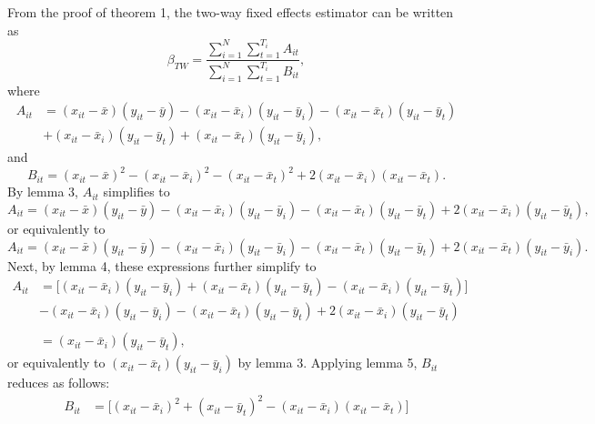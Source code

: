 \documentclass{article}[12pt]
\newenvironment{proof}[1][Proof.]{\begin{trivlist}
\item[\hskip \labelsep {\bfseries #1}]}{\end{trivlist}}
\begin{document}
\begin{proof}
From the proof of theorem 1, the two-way fixed effects estimator can be written as
\begin{equation}
\beta_{TW}=\frac{\sum_{i=1}^N\sum_{t=1}^{T_i} A_{it}}{\sum_{i=1}^N\sum_{t=1}^{T_i} B_{it}},
\end{equation}
where
\begin{align}
A_{it} & = (x_{it}  - \bar{x})(y_{it}  - \bar{y}) - (x_{it}  - \bar{x}_i)(y_{it}  - \bar{y}_i) - (x_{it}  - \bar{x}_t)(y_{it}  - \bar{y}_t) \nonumber\\
& + (x_{it}  - \bar{x}_i)(y_{it}  - \bar{y}_t) + (x_{it}  - \bar{x}_t)(y_{it}  - \bar{y}_i),
\end{align}
and
\begin{equation}
B_{it} =  (x_{it}  - \bar{x})^2 - (x_{it}  - \bar{x}_i)^2 - (x_{it}  - \bar{x}_t)^2 + 2(x_{it}  - \bar{x}_i)(x_{it}  - \bar{x}_t).
\end{equation}
By lemma 3, $A_{it}$ simplifies to
\begin{equation}
A_{it} = (x_{it}  - \bar{x})(y_{it}  - \bar{y}) - (x_{it}  - \bar{x}_i)(y_{it}  - \bar{y}_i) - (x_{it}  - \bar{x}_t)(y_{it}  - \bar{y}_t) + 2(x_{it}  - \bar{x}_i)(y_{it}  - \bar{y}_t),
\end{equation}
or equivalently to
\begin{equation}
A_{it} = (x_{it}  - \bar{x})(y_{it}  - \bar{y}) - (x_{it}  - \bar{x}_i)(y_{it}  - \bar{y}_i) - (x_{it}  - \bar{x}_t)(y_{it}  - \bar{y}_t) + 2(x_{it}  - \bar{x}_t)(y_{it}  - \bar{y}_i).
\end{equation}
Next, by lemma 4, these expressions further simplify to
\begin{align}
A_{it} & = \Big[(x_{it}  - \bar{x}_i)(y_{it} - \bar{y}_i) + (x_{it}  - \bar{x}_t)(y_{it} - \bar{y}_t) - (x_{it}- \bar{x}_i)(y_{it} - \bar{y}_t)\Big]  \nonumber\\
&- (x_{it}  - \bar{x}_i)(y_{it}  - \bar{y}_i) - (x_{it}  - \bar{x}_t)(y_{it}  - \bar{y}_t) + 2(x_{it}  - \bar{x}_i)(y_{it}  - \bar{y}_t)\nonumber\\
&\nonumber\\
& = (x_{it}  - \bar{x}_i)(y_{it}  - \bar{y}_t),
\end{align}
or equivalently to $(x_{it}  - \bar{x}_t)(y_{it}  - \bar{y}_i)$ by lemma 3. Applying lemma 5, $B_{it}$ reduces as follows:
\begin{align}
B_{it} &=  \Big[(x_{it}  - \bar{x}_i)^2 + (x_{it} - \bar{y}_t)^2 - (x_{it}  - \bar{x}_i)(x_{it} - \bar{x}_t)\Big]\nonumber\\

\end{align}
\end{proof}
\end{document}
